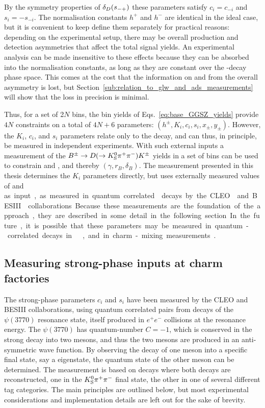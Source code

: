 By the symmetry properties of $\delta_D(s_{-+})$ these parameters satisfy ${c_i=c_{-i}}$ and ${s_i=-s_{-i}}$. The normalisation constants $h^+$ and $h^-$ are identical in the ideal case, but it is convenient to keep define them separately for practical reasons: depending on the experimental setup, there may be overall production and detection asymmetries that affect the total signal yields. An experimental analysis can be made insensitive to these effects because they can be absorbed into the normalisation constants, as long as they are constant over the \D-decay phase space. This comes at the cost that the information on \xpm and \ypm from the overall \CP asymmetry is lost, but Section~\ref{sub:relation_to_glw_and_ads_measurements} will show that the loss in precision is minimal.

Thus, for a set of 2$N$ bins, the bin yields of Eqs.~\eqref{eq:base_GGSZ_yields} provide $4N$ constraints on a total of $4N+6$  parameters: $(h^\pm, K_i, c_i, s_i, x_\pm, y_\pm)$. However, the $K_i$, $c_i$, and $s_i$ parameters relate only to the \D decay, and can thus, in principle, be measured in independent experiments. With such external inputs a measurement of the ${{B}^\pm}\rightarrow D(\rightarrow{\ensuremath{{K}^0_{\mathrm{S}}}}{\ensuremath{{\pi}^+}}{\ensuremath{{\pi}^-}}){{K}^\pm}$ yields in a set of bins can be used to constrain \xpm and \ypm, and thereby $(\gamma, r_B, \delta_B)$. The measurement presented in this thesis determines the $K_i$ parameters directly, but uses externally measured values of \ci and \si as input, as measured in quantum correlated \D decays by the CLEO~\cite{CLEOCISI} and BESIII~\cite{BESCISI} collaborations. Because these measurements are the foundation of the approach, they are described in some detail in the following section. In the future, it is possible that these parameters may be measured in quantum-correlated decays in \lhcb~\cite{aaijNearthresholdDDMathrmD2019}, and in charm-mixing measurements~\cite{thomasModelindependentOverlineDMixing2012}.

\subsection{Measuring strong-phase inputs at charm factories} %
\label{sub:measuring_strong_phase_inputs_at_charm_factories}

The strong-phase parameters $c_i$ and $s_i$ have been measured by the CLEO and BESIII collaborations, using quantum correlated \Dz\Dzb pairs from decays of the $\psi(3770)$ resonance state, itself produced in $e^+e^-$ collisions at the resonance energy. The $\psi(3770)$ has quantum-number $C=-1$, which is conserved in the strong decay into two \D mesons, and thus the two \D mesons are produced in an anti-symmetric wave function. By observing the decay of one \D meson into a specific final state, say a \CP eigenstate, the quantum state of the other \D meson can be determined. The measurement is based on decays where both \D decays are reconstructed, one in the ${{K}^0_{\mathrm{S}}}{{\pi}^+}{{\pi}^-}$ final state, the other in one of several different tag categories. The main principles are outlined below, but most experimental considerations and implementation details are left out for the sake of brevity.

